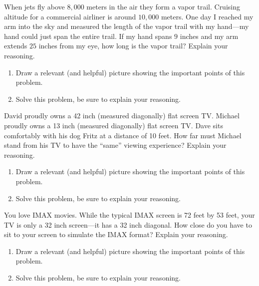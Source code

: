 \documentclass[nooutcomes]{ximera}
\begin{document}
\begin{question}
When jets fly above $8,000$ meters in the air they form a vapor
  trail. Cruising altitude for a commercial airliner is around $10,000$
  meters. One day I reached my arm into the sky and measured the
  length of the vapor trail with my hand---my hand could just span the
  entire trail. If my hand spans $9$ inches and my arm extends $25$
  inches from my eye, how long is the vapor trail? Explain your
  reasoning.
\begin{enumerate}
\item Draw a relevant (and helpful) picture showing the important
  points of this problem.
\item Solve this problem, be sure to explain your reasoning.
\end{enumerate}

\begin{freeResponse}
\begin{hint}
\end{hint}
\end{freeResponse}
\end{question}

\begin{question}
David proudly owns a 42 inch (measured diagonally) flat screen
  TV. Michael proudly owns a 13 inch (measured diagonally) flat screen
  TV. Dave sits comfortably with his dog Fritz at a distance of 10
  feet. How far must Michael stand from his TV to have the ``same''
  viewing experience?  Explain your reasoning.
\begin{enumerate}
\item Draw a relevant (and helpful) picture showing the important
  points of this problem.
\item Solve this problem, be sure to explain your reasoning.
\end{enumerate}
\begin{freeResponse}
\begin{hint}
\end{hint}
\end{freeResponse}
\end{question}

\begin{question}
You love IMAX movies. While the typical IMAX screen is 72 feet
  by 53 feet, your TV is only a 32 inch screen---it has a 32 inch
  diagonal. How close do you have to sit to your screen to simulate
  the IMAX format? Explain your reasoning.
\begin{enumerate}
\item Draw a relevant (and helpful) picture showing the important
  points of this problem.
\item Solve this problem, be sure to explain your reasoning.
\end{enumerate}
\begin{freeResponse}
\begin{hint}
\end{hint}
\end{freeResponse}
\end{question}
\end{document}
